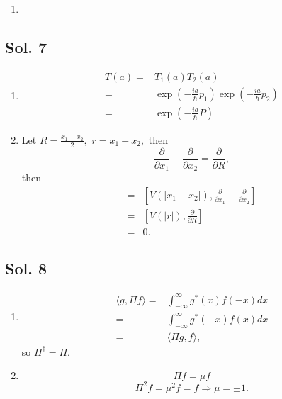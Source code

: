 \begin{enumerate}
    In the unit of $\frac{\hbar^2}{2ma^2}:$
    
    For $qa=-\pi,$ $E_1=-6.98,$ $E_2 = 5.62.$

    For $qa=-\pi/2,$ $E_1=-10.06,$ $E_2 = 13.55.$

    For $qa=0,$ $E_1=-11.99,$ $E_2 = 28.85.$

    For $qa=\pi/2,$ $E_1=-10.06,$ $E_2 = 13.55.$

    For $qa=\pi,$ $E_1=-6.98,$ $E_2 = 5.62.$
    \item 
    
\end{enumerate}

\subsection*{Sol. 7}
\begin{enumerate}
    \item 
    \begin{align*}
        T(a) =& T_1(a)T_2(a)\\
        =&\exp(-\frac{ia}{\hbar}p_1)\exp(-\frac{ia}{\hbar}p_2)\\
        =&\exp(-\frac{ia}{\hbar}P)
    \end{align*}
    \item 
    Let $R=\frac{x_1+x_2}{2},$ $r=x_1-x_2,$ then 
    $$
    \frac{\partial}{\partial x_1}+\frac{\partial}{\partial x_2}
    =\frac{\partial}{\partial R}, 
    $$
    then
    \begin{align*}
        [H,P] =& \left[V(|x_1-x_2|), \frac{\partial}{\partial x_1}+\frac{\partial}{\partial x_2}\right]
        \\
        =&\left[V(|r|), \frac{\partial}{\partial R}\right]\\
        =& 0.
    \end{align*}
\end{enumerate}

\subsection*{Sol. 8}
\begin{enumerate}
    \item 
    \begin{align*}
        \langle g, \Pi f\rangle
        =&\int_{-\infty}^{\infty} g^*(x)f(-x)dx\\
        =&\int_{-\infty}^{\infty} g^*(-x)f(x)dx\\
        =&\langle \Pi g,  f\rangle,
    \end{align*}
    so $\Pi^\dagger = \Pi.$
    \item 
    $$
    \Pi f = \mu f
    $$
    $$
    \Pi^2 f = \mu^2 f = f\Rightarrow \mu=\pm 1.
    $$
\end{enumerate}

